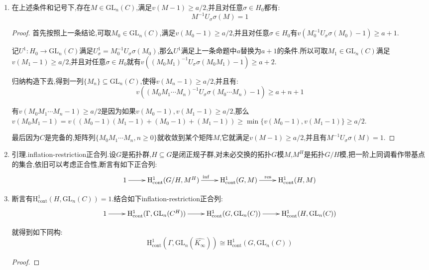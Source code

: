 \begin{enumerate}
\begin{proof}
		估计赋值,有$v(M_S-M_{\tau S})\ge-a/2+a+1+a/2=a+1$.至此得到:
		$$v(M_S^{-1}M_{\tau S}-1)=v(M_S^{-1}(M_{\tau S}-M_S))\ge a+1$$
	\end{proof}
	\item 在上述条件和记号下,存在$M\in\mathrm{GL}_n(C)$,满足$v(M-1)\ge a/2$,并且对任意$\sigma\in H_0$都有:$$M^{-1}U_{\sigma}\sigma(M)=1$$
	\begin{proof}
		
		首先按照上一条结论,可取$M_0\in\mathrm{GL}_n(C)$,满足$v(M_0-1)\ge a/2$,并且对任意$\sigma\in H_0$有$v(M_0^{-1}U_{\sigma}\sigma(M_0)-1)\ge a+1$.
		
		\qquad
		
		记$U^1:H_0\to\mathrm{GL}_n(C)$满足$U^1_{\sigma}=M_0^{-1}U_{\sigma}\sigma(M_0)$,那么$U^1$满足上一条命题中$a$替换为$a+1$的条件.所以可取$M_1\in\mathrm{GL}_n(C)$满足$v(M_1-1)\ge a/2$,并且对任意$\sigma\in H_0$就有$v((M_0M_1)^{-1}U_{\sigma}\sigma(M_0M_1)-1)\ge a+2$.
		
		\qquad
		
		归纳构造下去,得到一列$\{M_n\}\subseteq\mathrm{GL}_n(C)$,使得$v(M_n-1)\ge a/2$,并且有:
		$$v((M_0M_1\cdots M_n)^{-1}U_{\sigma}\sigma(M_0\cdots M_n)-1)\ge a+n+1$$
		
		有$v(M_0M_1\cdots M_n-1)\ge a/2$是因为如果$v(M_0-1),v(M_1-1)\ge a/2$,那么$v(M_0M_1-1)=v((M_0-1)(M_1-1)+(M_0-1)+(M_1-1))\ge\min\{v(M_0-1),v(M_1-1)\}\ge a/2$.
		
		\qquad
		
		最后因为$C$是完备的,矩阵列$\{M_0M_1\cdots M_n,n\ge0\}$就收敛到某个矩阵$M$,它就满足$v(M-1)\ge a/2$,并且有$M^{-1}U_{\sigma}\sigma(M)=1$.
	\end{proof}
	\item 引理.inflation-restriction正合列.设$G$是拓扑群,$H\subseteq G$是闭正规子群,对未必交换的拓扑$G$模$M$,$M^H$是拓扑$G/H$模,把一阶上同调看作带基点的集合,依旧可以考虑正合性,断言有如下正合列:
	$$\xymatrix{1\ar[r]&\mathrm{H}^1_{\mathrm{cont}}(G/H,M^H)\ar[r]^{\mathrm{inf}}&\mathrm{H}^1_{\mathrm{cont}}(G,M)\ar[r]^{\mathrm{res}}&\mathrm{H}^1_{\mathrm{cont}}(H,M)}$$
	\item 断言有$\mathrm{H}^1_{\mathrm{cont}}(H,\mathrm{GL}_n(C))=1$.结合如下inflation-restriction正合列:$$\xymatrix{1\ar[r]&\mathrm{H}^1_{\mathrm{cont}}(\Gamma,\mathrm{GL}_n(C^H))\ar[r]&\mathrm{H}^1_{\mathrm{cont}}(G,\mathrm{GL}_n(C))\ar[r]&\mathrm{H}^1_{\mathrm{cont}}(H,\mathrm{GL}_n(C))}$$
	
	就得到如下同构:$$\mathrm{H}^1_{\mathrm{cont}}(\Gamma,\mathrm{GL}_n(\widehat{K_{\infty}}))\cong\mathrm{H}^1_{\mathrm{cont}}(G,\mathrm{GL}_n(C))$$
	\begin{proof}
		

\end{proof}
\end{enumerate}
